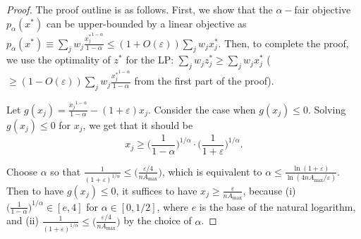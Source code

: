 \documentclass[11pt]{article}
\begin{document}
\begin{proof}
The proof outline is as follows. First, we show that the $\alpha-$fair objective $p_\alpha(x^*)$ can be upper-bounded by a linear objective as $p_\alpha(x^*)\equiv \sum_j w_j \frac{{x_j^*}^{1-\alpha}}{1-\alpha}\leq (1+O(\varepsilon))\sum_j w_j x_j^*$. Then, to complete the proof, we use the optimality of $z^*$ for the LP: $\sum_j w_j z_j^*\geq \sum_j w_j x_j^*$ ($\geq (1-O(\varepsilon)) \sum_j w_j \frac{{x_j^*}^{1-\alpha}}{1-\alpha}$ from the first part of the proof).

Let $g(x_j) = \frac{{x_j}^{1-\alpha}}{1-\alpha} - (1+\varepsilon)x_j$. Consider the case when $g(x_j)\leq 0$. Solving $g(x_j)\leq 0$ for $x_j$, we get that it should be 
\begin{equation}
x_j \geq \Big(\frac{1}{1-\alpha}\Big)^{1/\alpha}\cdot \Big(\frac{1}{1+\varepsilon}\Big)^{1/\alpha}.\label{eq:x-j-alpha-c}
\end{equation}

Choose $\alpha$ so that $\frac{1}{(1+\varepsilon)^{1/\alpha}} \leq \big(\frac{\varepsilon/4}{nA_{\max}}\big)$, which is equivalent to $\alpha \leq \frac{\ln(1+\varepsilon)}{\ln(4nA_{\max}/\varepsilon)}$. Then to have $g(x_j)\leq 0$, it suffices to have $x_j \geq \frac{\varepsilon}{nA_{\max}}$, because (i) $\big(\frac{1}{1-\alpha}\big)^{1/\alpha} \in [e, 4]$ for $\alpha \in [0, 1/2]$, where $e$ is the base of the natural logarithm, and (ii) $\frac{1}{(1+\varepsilon)^{1/\alpha}} \leq \big(\frac{\varepsilon/4}{nA_{\max}}\big)$ by the choice of $\alpha$.


\end{proof}
\end{document}
